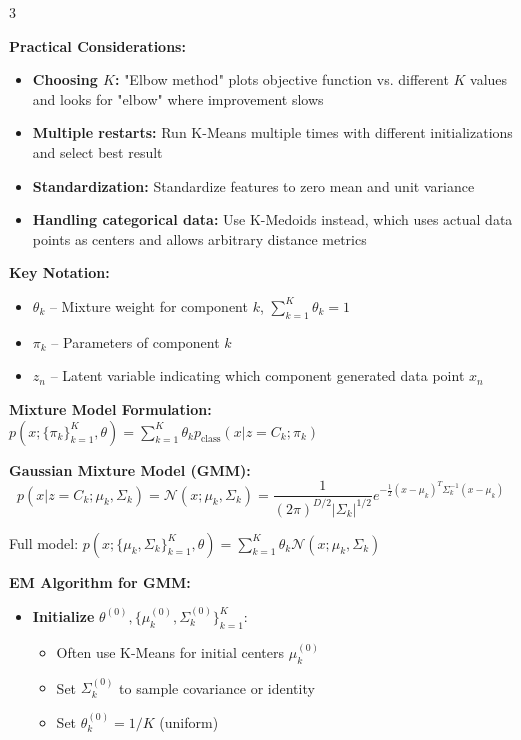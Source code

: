 \documentclass[10pt,landscape]{article}
\begin{document}
\begin{multicols}{3}
\begin{tcolorbox}[breakable, title=K-Means Clustering, colback=kmeans, boxsep=1pt, left=1pt, right=1pt, top=1pt, bottom=1pt]
\textbf{Practical Considerations:}
\begin{itemize}[leftmargin=*,noitemsep,topsep=0pt]
    \item \textbf{Choosing $K$:} "Elbow method" plots objective function vs. different $K$ values and looks for "elbow" where improvement slows
    
    \item \textbf{Multiple restarts:} Run K-Means multiple times with different initializations and select best result
    
    \item \textbf{Standardization:} Standardize features to zero mean and unit variance
    
    \item \textbf{Handling categorical data:} Use K-Medoids instead, which uses actual data points as centers and allows arbitrary distance metrics
\end{itemize}
\end{tcolorbox}

\begin{tcolorbox}[breakable, title=Mixture Models, colback=mixture, boxsep=1pt, left=1pt, right=1pt, top=1pt, bottom=1pt]
\textbf{Key Notation:}
\begin{itemize}[leftmargin=*,noitemsep,topsep=0pt]
    \item $\theta_k$ -- Mixture weight for component $k$, $\sum_{k=1}^K \theta_k = 1$
    \item $\pi_k$ -- Parameters of component $k$
    \item $z_n$ -- Latent variable indicating which component generated data point $x_n$
\end{itemize}

\textbf{Mixture Model Formulation:}
$p(x; \{\pi_k\}_{k=1}^K, \theta) = \sum_{k=1}^K \theta_k p_{\text{class}}(x|z = C_k; \pi_k)$

\textbf{Gaussian Mixture Model (GMM):}
\begin{equation}
p(x|z = C_k; \mu_k, \Sigma_k) = \mathcal{N}(x; \mu_k, \Sigma_k) = \frac{1}{(2\pi)^{D/2}|\Sigma_k|^{1/2}}e^{-\frac{1}{2}(x-\mu_k)^T\Sigma_k^{-1}(x-\mu_k)}
\end{equation}

Full model: $p(x; \{\mu_k, \Sigma_k\}_{k=1}^K, \theta) = \sum_{k=1}^K \theta_k \mathcal{N}(x; \mu_k, \Sigma_k)$

\textbf{EM Algorithm for GMM:}
\begin{itemize}[leftmargin=*,noitemsep,topsep=0pt]
    \item \textbf{Initialize} $\theta^{(0)}, \{\mu_k^{(0)}, \Sigma_k^{(0)}\}_{k=1}^K$:
    \begin{itemize}[noitemsep]
        \item Often use K-Means for initial centers $\mu_k^{(0)}$
        \item Set $\Sigma_k^{(0)}$ to sample covariance or identity
        \item Set $\theta_k^{(0)} = 1/K$ (uniform)
    \end{itemize}
    

\end{itemize}
\end{tcolorbox}
\end{multicols}
\end{document}
